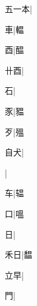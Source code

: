 \begin{multicols}{2}
{{\cjk{}五一本}|{}\par
{\cjk{}{\cnsym{}　}{\cnsym{}　}車}|{\cjk{}輼}\par
{\cjk{}{\cnsym{}　}{\cnsym{}　}酉}|{\cjk{}醖}\par
{\cjk{}{\cnsym{}　}卄酉}|{}\par
{\cjk{}{\cnsym{}　}{\cnsym{}　}石}|{}\par
{\cjk{}{\cnsym{}　}{\cnsym{}　}豕}|{\cjk{}豱}\par
{\cjk{}{\cnsym{}　}{\cnsym{}　}歹}|{\cjk{}殟}\par
{\cjk{}{\cnsym{}　}自犬}|{}\par
{}|{}\par
{\cjk{}{\cnsym{}　}{\cnsym{}　}车}|{\cjk{}辒}\par
{\cjk{}{\cnsym{}　}{\cnsym{}　}口}|{\cjk{}嗢}\par
{\cjk{}{\cnsym{}　}{\cnsym{}　}日}|{}\par
{\cjk{}{\cnsym{}　}禾日}|{\cjk{}馧}\par
{\cjk{}{\cnsym{}　}立早}|{}\par
{\cjk{}{\cnsym{}　}{\cnsym{}　}門}|{}\par
}
\end{multicols}
